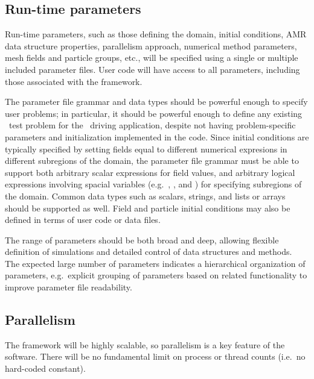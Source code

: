 \documentclass[10pt,twocolumn]{article}
\begin{document}
\subsection{Run-time parameters} \label{ss:require-parameters}

Run-time parameters, such as those defining the domain, initial
conditions, AMR data structure properties, parallelism approach,
numerical method parameters, mesh fields and particle groups, etc.,
will be specified using a single or multiple included parameter files.
User code will have access to all parameters, including those
associated with the framework.

The parameter file grammar and data types should be powerful enough to
specify user problems; in particular, it should be powerful enough to
define any existing \enzo\ test problem for the \enzoii\ driving
application, despite not having problem-specific parameters and
initialization implemented in the code.  Since initial conditions are
typically specified by setting fields equal to different numerical
expresions in different subregions of the domain, the parameter file
grammar must be able to support both arbitrary scalar expressions for
field values, and arbitrary logical expressions involving spacial
variables (e.g.~, , and ) for specifying
subregions of the domain.  Common data types such as scalars, strings,
and lists or arrays should be supported as well.  Field and particle
initial conditions may also be defined in terms of user code or data
files.

The range of parameters should be both broad and deep, allowing
flexible definition of simulations and detailed control of data
structures and methods.  The expected large number of parameters
indicates a hierarchical organization of parameters, e.g.~explicit
grouping of parameters based on related functionality to improve
parameter file readability.

\subsection{Parallelism} \label{ss:require-parallel}

The framework will be highly scalable, so parallelism is a key
feature of the software.  There will be no fundamental limit on
process or thread counts (i.e.~no hard-coded  constant).
\end{document}
